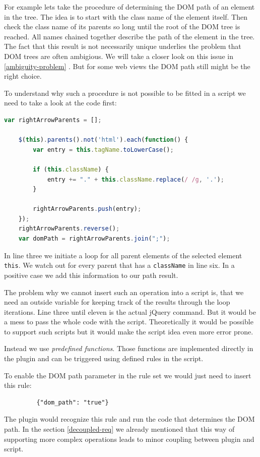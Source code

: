 For example lets take the procedure of determining the DOM path of an element in the tree. The idea is to start with the class name of the element itself. Then check the class name of its parents so long until the root of the DOM tree is reached. All names chained together describe the path of the element in the tree. The fact that this result is not necessarily unique underlies the problem that DOM trees are often ambigious. We will take a closer look on this issue in \ref{ambiguity-problem} . But for some web views the DOM path still might be the right choice. 

To understand why such a procedure is not possible to be fitted in a script we need to take a look at the code first:

\begin{lstlisting}[language=JavaScript]
    var rightArrowParents = [];

    $(this).parents().not('html').each(function() {
        var entry = this.tagName.toLowerCase();

        if (this.className) {
            entry += "." + this.className.replace(/ /g, '.');
        }

        rightArrowParents.push(entry);
    });
    rightArrowParents.reverse();    
    var domPath = rightArrowParents.join(";");
\end{lstlisting}

In line three we initiate a loop for all parent elements of the selected element \verb^this^. We watch out for every parent that has a \verb^className^ in line six. In a positive case we add this information to our path result. 

The problem why we cannot insert such an operation into a script is, that we need an outside variable for keeping track of the results through the loop iterations. Line three until eleven is the actual jQuery command. But it would be a mess to pass the whole code with the script. Theoretically it would be possible to support such scripts but it would make the script idea even more error prone. 

Instead we use \emph{predefined functions}. Those functions are implemented directly in the plugin and can be triggered using defined rules in the script. 

To enable the DOM path parameter in the rule set we would just need to insert this rule:
\begin{lstlisting}
         {"dom_path": "true"}
\end{lstlisting}
The plugin would recognize this rule and run the code that determines the DOM path. In the section \ref{decoupled-req} we already mentioned that this way of supporting more complex operations leads to minor coupling between plugin and script. 

